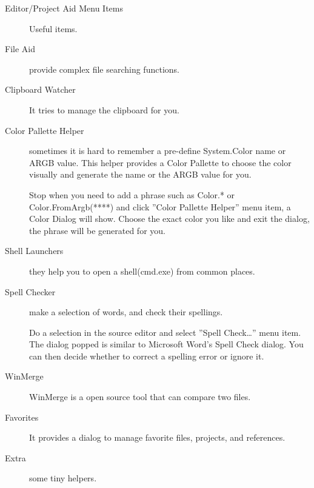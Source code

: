 \begin{description}

\item[Editor/Project Aid Menu Items] Useful items.



\item[File Aid] provide complex file searching functions.
\item[Clipboard Watcher] It tries to manage the clipboard for you.
\item[Color Pallette Helper] sometimes it is hard to remember a pre-define
System.Color name or ARGB value. This helper provides a Color Pallette to
choose the color visually and generate the name or the ARGB value for you.

Stop when you need to add a phrase such as Color.* or Color.FromArgb(****) and
click ''Color Pallette Helper'' menu item, a Color Dialog will show. Choose the
exact color you like and exit the dialog, the phrase will be generated for you.

\item[Shell Launchers] they help you to open a shell(cmd.exe) from common
places.

\item[Spell Checker] make a selection of words, and check their spellings.

Do a selection in the source editor and select ''Spell Check\dots'' menu item.
The dialog popped is similar to Microsoft Word's Spell Check dialog. You can
then decide whether to correct a spelling error or ignore it.



\item[WinMerge]WinMerge is a open source tool that can compare two files.

\item[Favorites]It provides a dialog to manage favorite files, projects, and references.

   \item[Extra] some tiny helpers.
\end{description}

